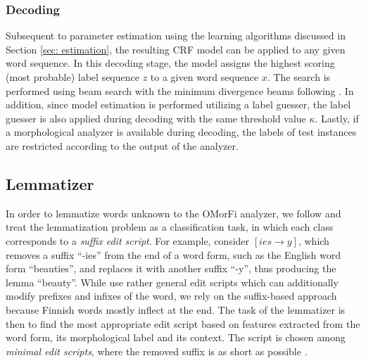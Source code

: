 \documentclass[smallextended]{svjour3}       %
\begin{document}






\subsubsection{Decoding}

Subsequent to parameter estimation using the learning algorithms discussed in Section \ref{sec: estimation}, the resulting CRF model can be applied to any given word sequence. In this decoding stage, the model assigns the highest scoring (most probable) label sequence $z$ to a given word sequence $x$. The search is performed using beam search with the minimum divergence beams following \citet{pal2006}. In addition, since model estimation is performed utilizing a label guesser, the label guesser is also applied during decoding with the same threshold value $\kappa$. Lastly, if a morphological analyzer is available during decoding, the labels of test instances are restricted according to the output of the analyzer.



\subsection{Lemmatizer}
\label{sec: lemmatizer}

In order to lemmatize words unknown to the OMorFi analyzer, we follow \citet{chrupala2008} and treat
the lemmatization problem as a classification task, in which each class corresponds to a {\it suffix edit
  script}. For example, consider $[ies \rightarrow y]$, which removes a suffix
``-ies'' from the end of a word form, such as the English word form
``beauties'', and replaces it with another suffix ``-y'', thus
producing the lemma ``beauty''. While \citet{chrupala2008} use rather general
edit scripts which can additionally modify prefixes and infixes of the
word, we rely on the suffix-based approach because
Finnish words mostly inflect at the end. The task of the
lemmatizer is then to find the most appropriate edit script based on
features extracted from the word form, its morphological label and
its context. The script is chosen among {\it minimal edit scripts}, where the removed suffix is as
short as possible \citep{chrupala2008}. 
\end{document}
